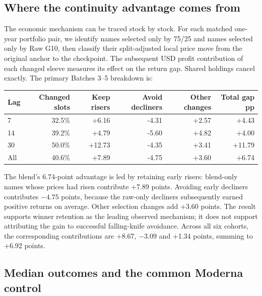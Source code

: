 \subsection{Where the continuity advantage comes from}

The economic mechanism can be traced stock by stock. For each matched
one-year portfolio pair, we identify names selected only by 75/25 and
names selected only by Raw G10, then classify their split-adjusted local
price move from the original anchor to the checkpoint. The subsequent
USD profit contribution of each changed sleeve measures its effect on
the return gap. Shared holdings cancel exactly. The primary Batches 3--5
breakdown is:

\begin{minipage}{\linewidth}
\begin{center}\small\setlength{\tabcolsep}{4pt}\renewcommand{\arraystretch}{1.18}
\begin{longtable}{@{}lrrrrr@{}}\toprule
Lag & Changed slots & Keep risers & Avoid decliners & Other changes & Total gap pp\\\midrule\endhead
7 & 32.5\% & +6.16 & -4.31 & +2.57 & +4.43\\
14 & 39.2\% & +4.79 & -5.60 & +4.82 & +4.00\\
30 & 50.0\% & +12.73 & -4.35 & +3.41 & +11.79\\
All & 40.6\% & +7.89 & -4.75 & +3.60 & +6.74\\
\bottomrule\end{longtable}\end{center}
\end{minipage}\par

The blend's 6.74-point advantage is led by retaining early risers:
blend-only names whose prices had risen contribute +7.89 points. Avoiding
early decliners contributes $-4.75$ points, because the raw-only decliners
subsequently earned positive returns on average. Other selection changes
add +3.60 points. The result supports winner retention as the leading
observed mechanism; it does not support attributing the gain to successful
falling-knife avoidance. Across all six cohorts, the corresponding
contributions are +8.67, $-3.09$ and +1.34 points, summing to +6.92 points.

\subsection{Median outcomes and the common Moderna control}

